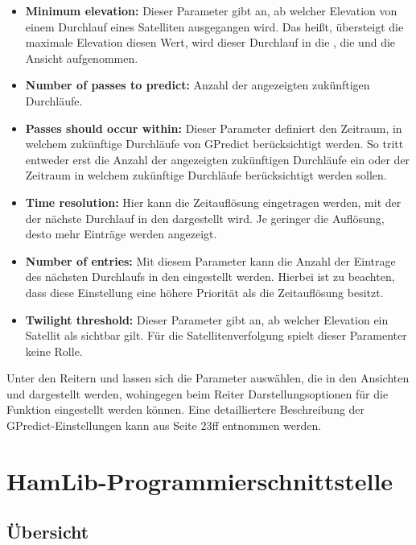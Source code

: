 \begin{itemize}
	\parskip0pt
	\item \textbf{Minimum elevation:} Dieser Parameter gibt an, ab welcher Elevation von einem Durchlauf eines Satelliten ausgegangen wird. Das heißt, übersteigt die maximale Elevation diesen Wert, wird dieser Durchlauf in die , die  und die Ansicht  aufgenommen.
	\item \textbf{Number of passes to predict:} Anzahl der angezeigten zukünftigen Durchläufe.
	\item \textbf{Passes should occur within:} Dieser Parameter definiert den Zeitraum, in welchem zukünftige Durchläufe von GPredict berücksichtigt werden. So tritt entweder erst die Anzahl der angezeigten zukünftigen Durchläufe ein oder der Zeitraum in welchem zukünftige Durchläufe berücksichtigt werden sollen.
	\item \textbf{Time resolution:}	Hier kann die Zeitauflösung eingetragen werden, mit der der nächste Durchlauf in den  dargestellt wird. Je geringer die Auflösung, desto mehr Einträge werden angezeigt.
	\item \textbf{Number of entries:} Mit diesem Parameter kann die Anzahl der Eintrage des nächsten Durchlaufs in den  eingestellt werden. Hierbei ist zu beachten, dass diese Einstellung eine höhere Priorität als die Zeitauflösung besitzt.
	\item \textbf{Twilight threshold:} Dieser Parameter gibt an, ab welcher Elevation ein Satellit als sichtbar gilt. Für die Satellitenverfolgung spielt dieser Paramenter keine Rolle.
\end{itemize}

Unter den Reitern  und  lassen sich die Parameter auswählen, die in den Ansichten  und  dargestellt werden, wohingegen beim Reiter  Darstellungsoptionen für die Funktion  eingestellt werden können.\newpar
Eine detailliertere Beschreibung der GPredict-Einstellungen kann aus \cite{gpredictmanual} Seite 23ff entnommen werden.

\section{HamLib-Programmierschnittstelle}

\subsection{Übersicht}

